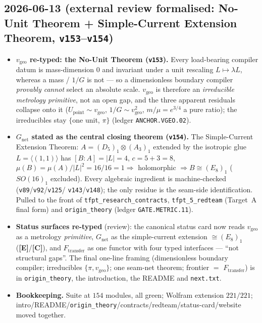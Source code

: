 \documentclass[11pt]{article}
\providecommand{\mE}{\textbf{[E]}}\providecommand{\mC}{\textbf{[C]}}
\providecommand{\vref}[1]{\texttt{#1}}
\begin{document}
\subsection*{2026-06-13 (external review formalised: No-Unit Theorem + Simple-Current Extension Theorem, \vref{v153}--\vref{v154})}
\begin{itemize}
\item \textbf{$v_{\mathrm{geo}}$ re-typed: the No-Unit Theorem (\vref{v153}).} Every load-bearing
  compiler datum is mass-dimension $0$ and invariant under a unit rescaling $L\mapsto\lambda L$,
  whereas a mass / $1/G$ is not --- so a dimensionless boundary compiler \emph{provably cannot}
  select an absolute scale. $v_{\mathrm{geo}}$ is therefore an \emph{irreducible metrology
  primitive}, not an open gap, and the three apparent residuals collapse onto it
  ($U_{\mathrm{point}}\sim v_{\mathrm{geo}}$, $1/G\sim v_{\mathrm{geo}}^2$, $m/\mu=e^{3/4}$ a pure
  ratio); the irreducibles stay $\{$one unit, $\pi\}$ (ledger \texttt{ANCHOR.VGEO.02}).
\item \textbf{$G_{\mathrm{net}}$ stated as the central closing theorem (\vref{v154}).} The Simple-Current
  Extension Theorem: $A{=}(D_5)_1{\otimes}(A_3)_1$ extended by the isotropic glue
  $L{=}\langle(1,1)\rangle$ has $[B{:}A]{=}|L|{=}4$, $c{=}5{+}3{=}8$,
  $\mu(B){=}\mu(A)/|L|^2{=}16/16{=}1\Rightarrow$ holomorphic $\Rightarrow B\cong(E_8)_1$ ($SO(16)_1$
  excluded). Every algebraic ingredient is machine-checked (\vref{v89}/\vref{v92}/\vref{v125}/%
  \vref{v143}/\vref{v148}); the only residue is the seam-side identification. Pulled to the front of
  \texttt{tfpt\_research\_contracts}, \texttt{tfpt\_5\_redteam} (Target~A final form) and
  \texttt{origin\_theory} (ledger \texttt{GATE.METRIC.11}).
\item \textbf{Status surfaces re-typed} (review): the canonical status card now reads
  $v_{\mathrm{geo}}$ as a metrology \emph{primitive}, $G_{\mathrm{net}}$ as the simple-current
  extension $\cong(E_8)_1$ (\mE/\mC), and $F_{\mathrm{transfer}}$ as one functor with four typed
  interfaces --- ``not structural gaps''. The final one-line framing (dimensionless boundary compiler;
  irreducibles $\{\pi, v_{\mathrm{geo}}\}$; one seam-net theorem; frontier $=$ $F_{\mathrm{transfer}}$)
  is in \texttt{origin\_theory}, the introduction, the README and \texttt{next.txt}.
\item \textbf{Bookkeeping.} Suite at $154$ modules, all green; Wolfram extension $221/221$;
  intro/README/\texttt{origin\_theory}/contracts/redteam/status-card/website moved together.
\end{itemize}
\end{document}
